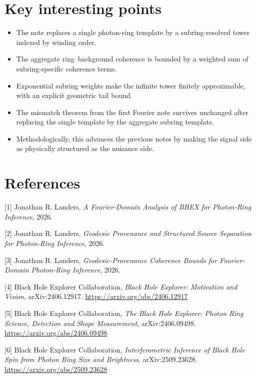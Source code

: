 \documentclass[10pt,letterpaper,twocolumn]{article}
\providecommand{\tightlist}{%
  \setlength{\itemsep}{0pt}\setlength{\parskip}{0pt}}
\begin{document}
\section{Key interesting points}

\begin{itemize}
\tightlist
\item The note replaces a single photon-ring template by a subring-resolved tower indexed by winding order.
\item The aggregate ring--background coherence is bounded by a weighted sum of subring-specific coherence terms.
\item Exponential subring weights make the infinite tower finitely approximable, with an explicit geometric tail bound.
\item The mismatch theorem from the first Fourier note survives unchanged after replacing the single template by the aggregate subring template.
\item Methodologically, this advances the previous notes by making the signal side as physically structured as the nuisance side.
\end{itemize}

\section*{References}

\noindent{}\hypertarget{ref-1}{}{[}1{]} Jonathan R. Landers,
\emph{A Fourier-Domain Analysis of BHEX for Photon-Ring Inference}, 2026.

\noindent{}\hypertarget{ref-2}{}{[}2{]} Jonathan R. Landers,
\emph{Geodesic Provenance and Structured Source Separation for Photon-Ring Inference}, 2026.

\noindent{}\hypertarget{ref-3}{}{[}3{]} Jonathan R. Landers,
\emph{Geodesic-Provenance Coherence Bounds for Fourier-Domain Photon-Ring Inference}, 2026.

\noindent{}\hypertarget{ref-4}{}{[}4{]} Black Hole Explorer Collaboration,
\emph{Black Hole Explorer: Motivation and Vision}, arXiv:2406.12917.
\url{https://arxiv.org/abs/2406.12917}

\noindent{}\hypertarget{ref-5}{}{[}5{]} Black Hole Explorer Collaboration,
\emph{The Black Hole Explorer: Photon Ring Science, Detection and Shape Measurement},
arXiv:2406.09498. \url{https://arxiv.org/abs/2406.09498}

\noindent{}\hypertarget{ref-6}{}{[}6{]} Black Hole Explorer Collaboration,
\emph{Interferometric Inference of Black Hole Spin from Photon Ring Size and Brightness},
arXiv:2509.23628. \url{https://arxiv.org/abs/2509.23628}
\end{document}
